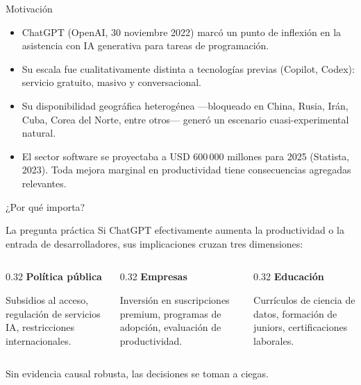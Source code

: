 \documentclass[10pt,aspectratio=169]{beamer}
\begin{document}
\begin{frame}{Motivación}
\begin{itemize}
  \item ChatGPT (OpenAI, 30 noviembre 2022) marcó un punto de inflexión en la asistencia con IA generativa para tareas de programación.
  \item Su escala fue cualitativamente distinta a tecnologías previas (Copilot, Codex): \alert{servicio gratuito, masivo y conversacional}.
  \item Su \alert{disponibilidad geográfica heterogénea} ---bloqueado en China, Rusia, Irán, Cuba, Corea del Norte, entre otros--- generó un escenario cuasi-experimental natural.
  \item El sector software se proyectaba a USD 600\,000 millones para 2025 (Statista, 2023). Toda mejora marginal en productividad tiene consecuencias agregadas relevantes.
\end{itemize}
\end{frame}

\begin{frame}{¿Por qué importa?}
\begin{block}{La pregunta práctica}
Si ChatGPT efectivamente aumenta la productividad o la entrada de desarrolladores, sus implicaciones cruzan tres dimensiones:
\end{block}

\begin{columns}[T]
\begin{column}{0.32\textwidth}
\textbf{\textcolor{pucpblue}{Política pública}}
\medskip

\small Subsidios al acceso, regulación de servicios IA, restricciones internacionales.
\end{column}
\begin{column}{0.32\textwidth}
\textbf{\textcolor{pucpblue}{Empresas}}
\medskip

\small Inversión en suscripciones premium, programas de adopción, evaluación de productividad.
\end{column}
\begin{column}{0.32\textwidth}
\textbf{\textcolor{pucpblue}{Educación}}
\medskip

\small Currículos de ciencia de datos, formación de juniors, certificaciones laborales.
\end{column}
\end{columns}

\vspace{1em}
\centering \alert{Sin evidencia causal robusta, las decisiones se toman a ciegas.}
\end{frame}
\end{document}
